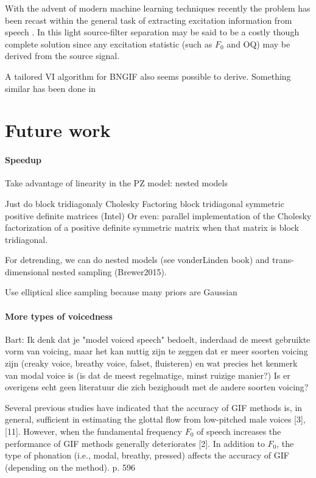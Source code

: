 With the advent of modern machine learning techniques recently the problem has been recast within the general task of extracting excitation information from speech \citep{Kadiri2021}.
In this light source-filter separation may be said to be a costly though complete solution since any excitation statistic (such as $F_0$ and OQ) may be derived from the source signal.

A tailored VI algorithm for BNGIF also seems possible to derive.
Something similar has been done in \citep{Yoshii2013} 

\section{Future work}

\paragraph{Speedup}

Take advantage of linearity in the PZ model: nested models

Just do block tridiagonaly Cholesky
Factoring block tridiagonal symmetric positive definite matrices (Intel)
Or even: parallel implementation of the Cholesky factorization of a positive definite symmetric matrix when that matrix is block tridiagonal. \citep{Cao2002}

For detrending, we can do nested models (see vonderLinden book) and trans-dimensional nested sampling (Brewer2015).

Use elliptical slice sampling because many priors are Gaussian \citep{Murray2010}

\paragraph{More types of voicedness}
Bart: Ik denk dat je "model voiced speech" bedoelt, inderdaad de meest gebruikte vorm van voicing, maar het kan nuttig zijn te zeggen dat er meer soorten voicing zijn (creaky voice, breathy voice, falset, fluisteren) en wat precies het kenmerk van modal voice is (is  dat de meest regelmatige, minst ruizige manier?) 
Is er overigens echt geen literatuur die zich bezighoudt met de andere soorten voicing?

Several previous studies have indicated that the accuracy of
GIF methods is, in general, sufficient in estimating the glottal
flow from low-pitched male voices [3], [11]. However, when
the fundamental frequency $F_0$ of speech increases the performance of GIF methods generally deteriorates [2]. In addition to $F_0$, the type of phonation (i.e., modal, breathy, pressed) affects
the accuracy of GIF (depending on the method).
\citep{Airaksinen2014} p. 596


